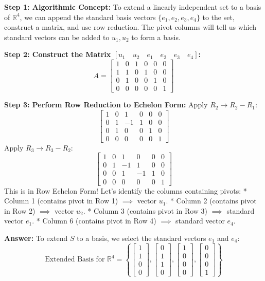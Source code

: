 \documentclass[11pt,a4paper]{article}
\begin{document}
\begin{solutionbox}
\textbf{Step 1: Algorithmic Concept:}
To extend a linearly independent set to a basis of $\mathbb{R}^4$, we can append the standard basis vectors $\{e_1, e_2, e_3, e_4\}$ to the set, construct a matrix, and use row reduction. The pivot columns will tell us which standard vectors can be added to $u_1, u_2$ to form a basis.

\textbf{Step 2: Construct the Matrix $[u_1 \quad u_2 \quad e_1 \quad e_2 \quad e_3 \quad e_4]$:}
\[ A = \begin{bmatrix} 1 & 0 & 1 & 0 & 0 & 0 \\ 1 & 1 & 0 & 1 & 0 & 0 \\ 0 & 1 & 0 & 0 & 1 & 0 \\ 0 & 0 & 0 & 0 & 0 & 1 \end{bmatrix} \]

\textbf{Step 3: Perform Row Reduction to Echelon Form:}
Apply $R_2 \to R_2 - R_1$:
\[ \begin{bmatrix} 1 & 0 & 1 & 0 & 0 & 0 \\ 0 & 1 & -1 & 1 & 0 & 0 \\ 0 & 1 & 0 & 0 & 1 & 0 \\ 0 & 0 & 0 & 0 & 0 & 1 \end{bmatrix} \]
Apply $R_3 \to R_3 - R_2$:
\[ \begin{bmatrix} 1 & 0 & 1 & 0 & 0 & 0 \\ 0 & 1 & -1 & 1 & 0 & 0 \\ 0 & 0 & 1 & -1 & 1 & 0 \\ 0 & 0 & 0 & 0 & 0 & 1 \end{bmatrix} \]
This is in Row Echelon Form! Let's identify the columns containing pivots:
* Column 1 (contains pivot in Row 1) $\implies$ vector $u_1$.
* Column 2 (contains pivot in Row 2) $\implies$ vector $u_2$.
* Column 3 (contains pivot in Row 3) $\implies$ standard vector $e_1$.
* Column 6 (contains pivot in Row 4) $\implies$ standard vector $e_4$.

\textbf{Answer:} 
To extend $S$ to a basis, we select the standard vectors $e_1$ and $e_4$:
\[ \text{Extended Basis for } \mathbb{R}^4 = \left\{ \begin{bmatrix} 1 \\ 1 \\ 0 \\ 0 \end{bmatrix}, \begin{bmatrix} 0 \\ 1 \\ 1 \\ 0 \end{bmatrix}, \begin{bmatrix} 1 \\ 0 \\ 0 \\ 0 \end{bmatrix}, \begin{bmatrix} 0 \\ 0 \\ 0 \\ 1 \end{bmatrix} \right\} \]
\end{solutionbox}
\end{document}
